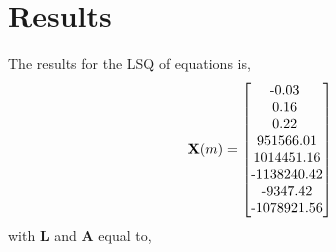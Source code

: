 
\section{Results} %
\label{sec:results}

The results for the LSQ of equations is,
\begin{equation}
	\mathbf{X}(m) = \left[\begin{matrix}
			$-0.03	$						\\	
			$0.16	$						\\  	
			$0.22	$						\\  	
			$951566.01$						\\   	
			$1014451.16$					\\   	
			$-1138240.42$					\\  	
			$-9347.42$						\\  	
			$-1078921.56$					\\  	
		\end{matrix}\right]
	\label{eq:xMatrix}
\end{equation} %
with $\mathbf{L}$ and $\mathbf{A}$ equal to,
